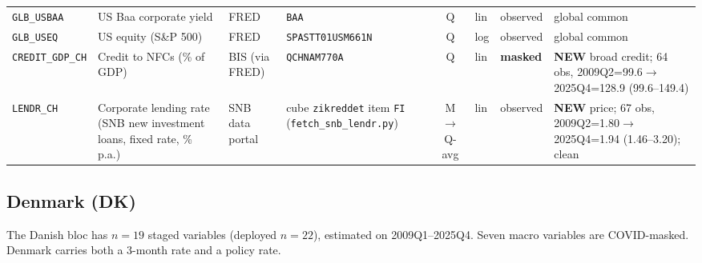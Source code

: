 {\begin{longtable}{@{}lp{2.9cm}p{1.9cm}p{2.0cm}cp{1.4cm}p{1.7cm}p{2.6cm}@{}}
\texttt{GLB\_USBAA} & US Baa corporate yield & FRED & \texttt{BAA} & Q & lin & observed & global common\\
\texttt{GLB\_USEQ} & US equity (S\&P 500) & FRED & \texttt{SPASTT01USM661N} & Q & log & observed & global common\\
\texttt{CREDIT\_GDP\_CH} & Credit to NFCs (\% of GDP) & BIS (via FRED) & \texttt{QCHNAM770A} & Q & lin & \textbf{masked} & \textbf{NEW} broad credit; 64 obs, 2009Q2=99.6$\to$2025Q4=128.9 (99.6--149.4)\\
\texttt{LENDR\_CH} & Corporate lending rate (SNB new investment loans, fixed rate, \% p.a.) & SNB data portal & cube \texttt{zikreddet} item \texttt{FI} (\texttt{fetch\_snb\_lendr.py}) & M$\to$Q-avg & lin & observed & \textbf{NEW} price; 67 obs, 2009Q2=1.80$\to$2025Q4=1.94 (1.46--3.20); clean\\
\end{longtable}}

\subsection{Denmark (DK)}\label{sec:data:DK}

The Danish bloc has $n=19$ staged variables (deployed $n=22$), estimated on
2009Q1--2025Q4. Seven macro variables are COVID-masked. Denmark carries both a
3-month rate and a policy rate.

